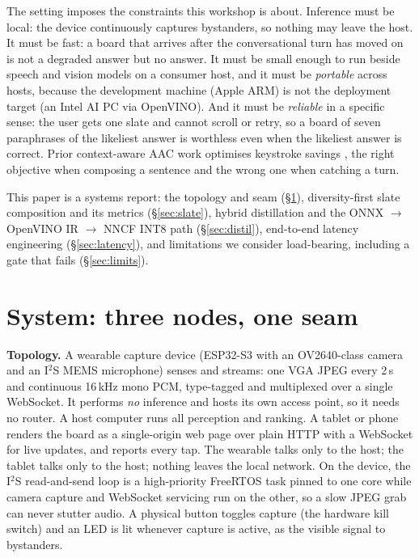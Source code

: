 The setting imposes the constraints this workshop is about. Inference must be
local: the device continuously captures bystanders, so nothing may leave the
host. It must be fast: a board that arrives after the conversational turn has
moved on is not a degraded answer but no answer. It must be small enough to
run beside speech and vision models on a consumer host, and it must be
\emph{portable} across hosts, because the development machine (Apple ARM) is
not the deployment target (an Intel AI PC via OpenVINO). And it must be
\emph{reliable} in a specific sense: the user gets one slate and cannot scroll
or retry, so a board of seven paraphrases of the likeliest answer is worthless
even when the likeliest answer is correct. Prior context-aware AAC work
optimises keystroke savings \citep{kwickchat2022,praact2024}, the right
objective when composing a sentence and the wrong one when catching a turn.

This paper is a systems report: the topology and seam (\S\ref{sec:system}),
diversity-first slate composition and its metrics (\S\ref{sec:slate}), hybrid
distillation and the ONNX $\rightarrow$ OpenVINO IR $\rightarrow$ NNCF INT8 path
(\S\ref{sec:distil}), end-to-end latency engineering (\S\ref{sec:latency}), and
limitations we consider load-bearing, including a gate that fails
(\S\ref{sec:limits}).

\section{System: three nodes, one seam}\label{sec:system}

\textbf{Topology.} A wearable capture device (ESP32-S3 with an OV2640-class
camera and an I$^2$S MEMS microphone) senses and streams: one VGA JPEG every
2\,s and continuous 16\,kHz mono PCM, type-tagged and multiplexed over a single
WebSocket. It performs \emph{no} inference and hosts its own access point, so it
needs no router. A host computer runs all perception and ranking. A tablet or
phone renders the board as a single-origin web page over plain HTTP with a
WebSocket for live updates, and reports every tap. The wearable talks only to
the host; the tablet talks only to the host; nothing leaves the local network.
On the device, the I$^2$S read-and-send loop is a high-priority FreeRTOS task
pinned to one core while camera capture and WebSocket servicing run on the
other, so a slow JPEG grab can never stutter audio. A physical button toggles
capture (the hardware kill switch) and an LED is lit whenever capture is active,
as the visible signal to bystanders.

